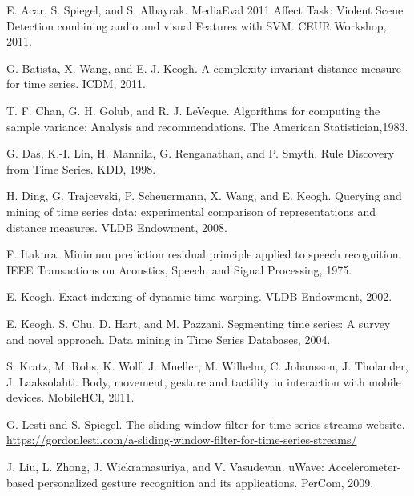 \begin{thebibliography}{11} 

    E. Acar, S. Spiegel, and S. Albayrak.
    MediaEval 2011 Affect Task: Violent Scene Detection combining audio and visual Features with SVM.
	CEUR Workshop, 2011.

    G. Batista, X. Wang, and E. J. Keogh.
    A complexity-invariant distance measure for time series.
	ICDM, 2011.

    T. F. Chan, G. H. Golub, and R. J. LeVeque.
    Algorithms for computing the sample variance: Analysis and recommendations.
	The American Statistician,1983.

    G. Das, K.-I. Lin, H. Mannila, G. Renganathan, and P. Smyth.
    Rule Discovery from Time Series.
	KDD, 1998.

    H. Ding, G. Trajcevski, P. Scheuermann, X. Wang, and E. Keogh.
    Querying and mining of time series data: experimental comparison of representations and distance measures.
	VLDB Endowment, 2008.

    F. Itakura.
    Minimum prediction residual principle applied to speech recognition.
    IEEE Transactions on Acoustics, Speech, and Signal Processing, 1975.

    E. Keogh.
    Exact indexing of dynamic time warping.
    VLDB Endowment, 2002.

	E. Keogh, S. Chu, D. Hart, and M. Pazzani.
	Segmenting time series: A survey and novel approach.
	Data mining in Time Series Databases, 2004.

	S. Kratz, M. Rohs, K. Wolf, J. Mueller, M. Wilhelm, C. Johansson, J. Tholander, J. Laaksolahti.
	Body, movement, gesture and tactility in interaction with mobile devices.
	MobileHCI, 2011.

	G. Lesti and S. Spiegel.
	The sliding window filter for time series streams website.
	\url{https://gordonlesti.com/a-sliding-window-filter-for-time-series-streams/}

    J. Liu, L. Zhong, J. Wickramasuriya, and V. Vasudevan.
    uWave: Accelerometer-based personalized gesture recognition and its applications.
    PerCom, 2009.


\end{thebibliography}
